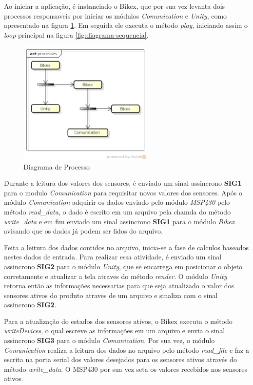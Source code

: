 
Ao iniciar a aplicação, é  instanciado o Bikex, que por sua vez levanta dois processos responsaveis por iniciar os módulos \textit{Comunication} e \textit{Unity}, como apresentado na figura \ref{fig:diagrama-processo}. Em seguida ele executa o método \textit{play}, iniciando assim o \textit{loop} principal na figura \ref{fig:diagrama-sequencia}. 

\begin{figure}[h]
  \centering
	\includegraphics[width=0.6\textwidth]{figuras/processes}
  \caption{Diagrama de Processo}
  \label{fig:diagrama-processo}
\end{figure}


Durante a leitura dos valores dos sensores, é enviado um sinal assincrono \textbf{SIG1} para o modulo \textit{Comunication}  para requisitar novos valores dos sensores. Após o módulo \textit{Comunication} adquirir os dados enviado pelo módulo \textit{MSP430} pelo método \textit{read\_data}, o dado é escrito em um arquivo pela chamda do método \textit{write\_data} e em fim enviado um sinal assincrono \textbf{SIG1} para o módulo \textit{Bikex} avisando que os dados já podem ser lidos do arquivo.

Feita a leitura dos dados contidos no arquivo, inicia-se a fase de calculos baseados nestes dados de entrada. Para realizar essa atividade, é enviado um sinal assincrono \textbf{SIG2} para o módulo \textit{Unity}, que se encarrega em posicionar o objeto corretamente e atualizar a tela atraves do método \textit{render}. O módulo \textit{Unity} retorna então as informações necessarias para que seja atualizado o valor dos sensores ativos do produto atraves de um arquivo  e sinaliza com o sinal assincrono \textbf{SIG2}.

Para a atualização do estados dos sensores ativos, o Bikex executa o método \textit{writeDevices}, o qual escreve as informações em um arquivo e envia o sinal assincrono \textbf{SIG3} para o módulo \textit{Comunication}. Por sua vez, o módulo \textit{Comunication} realiza a leitura dos dados no arquivo pelo método \textit{read\_file} e  faz a escrita na porta serial dos valores desejados para os sensores ativos através do método \textit{write\_data}. O MSP430 por sua vez seta os valores recebidos nos sensores ativos.


